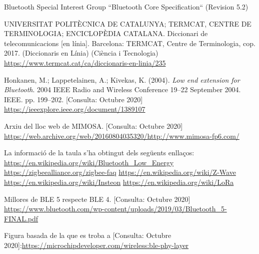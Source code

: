 \begin{thebibliography}{2}

Bluetooth Special Interest Group
``Bluetooth Core Specification``
(Revision 5.2)

UNIVERSITAT POLITÈCNICA DE CATALUNYA; TERMCAT, CENTRE DE TERMINOLOGIA; ENCICLOPÈDIA CATALANA. Diccionari de telecomunicacions [en línia]. Barcelona: TERMCAT, Centre de Terminologia, cop. 2017. (Diccionaris en Línia) (Ciència i Tecnologia)
\href{https://www.termcat.cat/ca/diccionaris-en-linia/235}{https://www.termcat.cat/ca/diccionaris-en-linia/235}

Honkanen, M.; Lappetelainen, A.; Kivekas, K. (2004). \textit{Low end extension for Bluetooth}. 2004 IEEE Radio and Wireless Conference 19–22 September 2004. IEEE. pp. 199–202.
[Consulta: Octubre 2020] \href{https://ieeexplore.ieee.org/document/1389107}{https://ieeexplore.ieee.org/document/1389107}

Arxiu del lloc web de MIMOSA. [Consulta: Octubre 2020]\newline
\href{https://web.archive.org/web/20160804035320/http://www.mimosa-fp6.com/}{https://web.archive.org/web/20160804035320/http://www.mimosa-fp6.com/}

La informació de la taula s'ha obtingut dels següents enllaços:
\href{https://en.wikipedia.org/wiki/Bluetooth_Low_Energy}{https://en.wikipedia.org/wiki/Bluetooth\_Low\_Energy}
\newline
\href{https://zigbeealliance.org/zigbee-faq}{https://zigbeealliance.org/zigbee-faq}
\newline
\href{https://en.wikipedia.org/wiki/Z-Wave}{https://en.wikipedia.org/wiki/Z-Wave}
\newline
\href{https://en.wikipedia.org/wiki/Insteon}{https://en.wikipedia.org/wiki/Insteon}
\newline
\href{https://en.wikipedia.org/wiki/LoRa}{https://en.wikipedia.org/wiki/LoRa}

Millores de BLE 5 respecte BLE 4. [Consulta: Octubre 2020]\newline
\href{https://www.bluetooth.com/wp-content/uploads/2019/03/Bluetooth\_5-FINAL.pdf}{https://www.bluetooth.com/wp-content/uploads/2019/03/Bluetooth\_5-FINAL.pdf}

Figura basada de la que es troba a [Consulta: Octubre 2020]:\newline \href{https://microchipdeveloper.com/wireless:ble-phy-layer}{https://microchipdeveloper.com/wireless:ble-phy-layer} 


\end{thebibliography}

